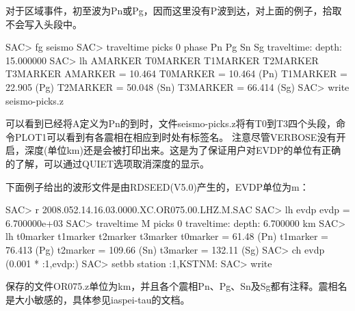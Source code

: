 对于区域事件，初至波为Pn或Pg，因而这里没有P波到达，对上面的例子，拾取不会写入头段中。
\begin{SACCode}
SAC> fg seismo
SAC>  traveltime picks 0 phase Pn Pg Sn Sg
traveltime: depth: 15.000000
SAC> lh AMARKER T0MARKER T1MARKER T2MARKER T3MARKER
AMARKER = 10.464                     
T0MARKER = 10.464           (Pn)
T1MARKER = 22.905           (Pg)
T2MARKER = 50.048           (Sn)
T3MARKER = 66.414           (Sg)
SAC> write seismo-picks.z
\end{SACCode}
可以看到已经将A定义为Pn的到时，文件seismo-picks.z将有T0到T3四个头段，命令PLOT1可以看到有各震相在相应到时处有标签名。
注意尽管VERBOSE没有开启，深度(单位km)还是会被打印出来。这是为了保证用户对EVDP的单位有正确的了解，可以通过QUIET选项取消深度的显示。

下面例子给出的波形文件是由RDSEED(V5.0)产生的，EVDP单位为m：
\begin{SACCode}
SAC> r 2008.052.14.16.03.0000.XC.OR075.00.LHZ.M.SAC
SAC> lh evdp
evdp = 6.700000e+03
SAC> traveltime M picks 0
traveltime: depth: 6.700000 km
SAC> lh t0marker t1marker t2marker t3marker
t0marker = 61.48            (Pn)        
t1marker = 76.413           (Pg)
t2marker = 109.66           (Sn)  
t3marker = 132.11           (Sg)
SAC> ch evdp (0.001 * :1,evdp:)
SAC> setbb station :1,KSTNM:
SAC> write %
\end{SACCode}
保存的文件OR075.z单位为km，并且各个震相Pn、Pg、Sn及Sg都有注释。震相名是大小敏感的，具体参见iaspei-tau的文档。
